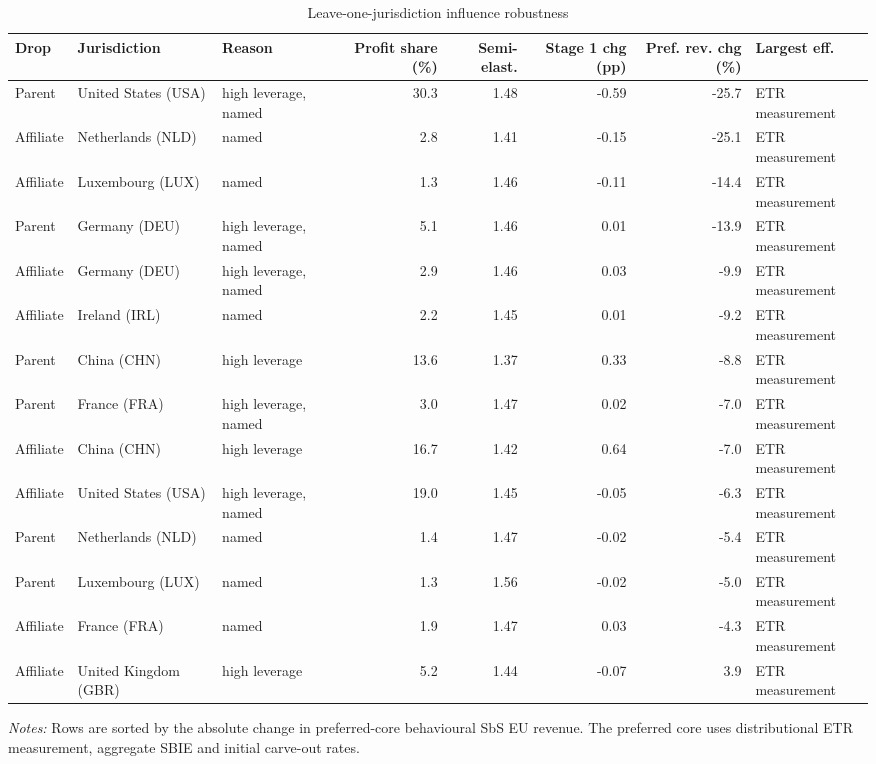 \begin{table}[H]
\centering
\scriptsize
\setlength{\tabcolsep}{2pt}
\caption{Leave-one-jurisdiction influence robustness}
\label{tab:app_jurisdiction_influence_summary}
\begin{adjustbox}{max width=\textwidth,center}
\begin{tabular}{@{}lL{2.5cm}lrrrrl@{}}
\toprule
Drop & Jurisdiction & Reason & Profit share (\%) & Semi-elast. & Stage 1 chg (pp) & Pref. rev. chg (\%) & Largest eff. \\
\midrule
Parent & United States (USA) & high leverage, named & 30.3 & 1.48 & -0.59 & -25.7 & ETR measurement \\
Affiliate & Netherlands (NLD) & named &  2.8 & 1.41 & -0.15 & -25.1 & ETR measurement \\
Affiliate & Luxembourg (LUX) & named &  1.3 & 1.46 & -0.11 & -14.4 & ETR measurement \\
Parent & Germany (DEU) & high leverage, named &  5.1 & 1.46 &  0.01 & -13.9 & ETR measurement \\
Affiliate & Germany (DEU) & high leverage, named &  2.9 & 1.46 &  0.03 &  -9.9 & ETR measurement \\
Affiliate & Ireland (IRL) & named &  2.2 & 1.45 &  0.01 &  -9.2 & ETR measurement \\
Parent & China (CHN) & high leverage & 13.6 & 1.37 &  0.33 &  -8.8 & ETR measurement \\
Parent & France (FRA) & high leverage, named &  3.0 & 1.47 &  0.02 &  -7.0 & ETR measurement \\
Affiliate & China (CHN) & high leverage & 16.7 & 1.42 &  0.64 &  -7.0 & ETR measurement \\
Affiliate & United States (USA) & high leverage, named & 19.0 & 1.45 & -0.05 &  -6.3 & ETR measurement \\
Parent & Netherlands (NLD) & named &  1.4 & 1.47 & -0.02 &  -5.4 & ETR measurement \\
Parent & Luxembourg (LUX) & named &  1.3 & 1.56 & -0.02 &  -5.0 & ETR measurement \\
Affiliate & France (FRA) & named &  1.9 & 1.47 &  0.03 &  -4.3 & ETR measurement \\
Affiliate & United Kingdom (GBR) & high leverage &  5.2 & 1.44 & -0.07 &   3.9 & ETR measurement \\
\bottomrule
\end{tabular}
\end{adjustbox}

\vspace{0.35em}
\noindent\begin{minipage}{\textwidth}
\footnotesize\raggedright\textit{Notes:} Rows are sorted by the absolute change in preferred-core behavioural SbS EU revenue. The preferred core uses distributional ETR measurement, aggregate SBIE and initial carve-out rates.
\end{minipage}
\end{table}
